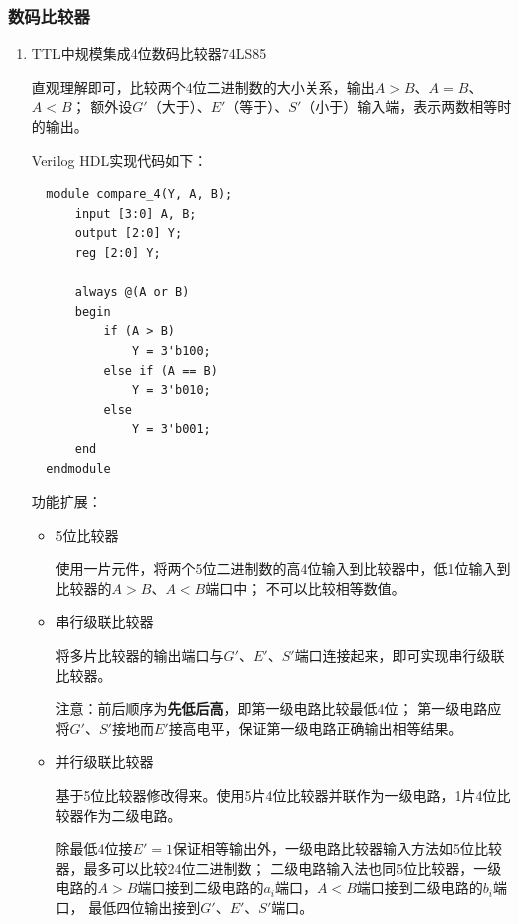\documentclass[UTF8,fontset=fandol,zihao=5]{ctexart}
\begin{document}
\subsubsection{数码比较器}

\begin{enumerate}
  \item TTL中规模集成4位数码比较器74LS85
  
  直观理解即可，比较两个4位二进制数的大小关系，输出$A>B$、$A=B$、$A<B$；
  额外设$G'$（大于）、$E'$（等于）、$S'$（小于）输入端，表示两数相等时的输出。
  
  Verilog HDL实现代码如下：

  \begin{verbatim}
  module compare_4(Y, A, B);
      input [3:0] A, B;
      output [2:0] Y;
      reg [2:0] Y;

      always @(A or B)
      begin
          if (A > B)
              Y = 3'b100;
          else if (A == B)
              Y = 3'b010;
          else
              Y = 3'b001;
      end
  endmodule
  \end{verbatim}

  功能扩展：

  \begin{itemize}
    \item 5位比较器
    
    使用一片元件，将两个5位二进制数的高4位输入到比较器中，低1位输入到比较器的$A>B$、$A<B$端口中；
    不可以比较相等数值。

    \item 串行级联比较器
    
    将多片比较器的输出端口与$G'$、$E'$、$S'$端口连接起来，即可实现串行级联比较器。

    注意：前后顺序为\textbf{先低后高}，即第一级电路比较最低4位；
    第一级电路应将$G'$、$S'$接地而$E'$接高电平，保证第一级电路正确输出相等结果。
    
    \item 并行级联比较器
    
    基于5位比较器修改得来。使用5片4位比较器并联作为一级电路，1片4位比较器作为二级电路。

    除最低4位接$E'=1$保证相等输出外，一级电路比较器输入方法如5位比较器，最多可以比较24位二进制数；
    二级电路输入法也同5位比较器，一级电路的$A>B$端口接到二级电路的$a_i$端口，$A<B$端口接到二级电路的$b_i$端口，
    最低四位输出接到$G'$、$E'$、$S'$端口。
  \end{itemize}
\end{enumerate}
\end{document}
